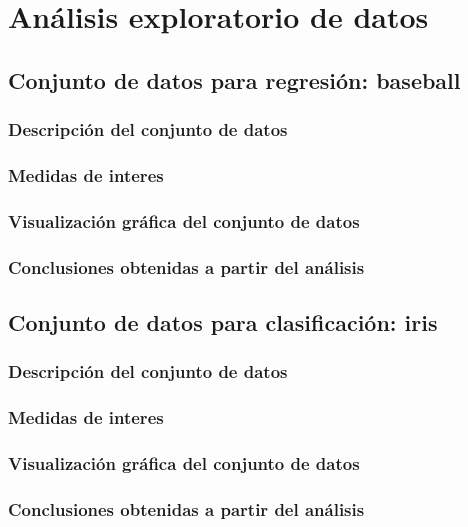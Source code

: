 \section{Análisis exploratorio de datos}


\subsection{Conjunto de datos para regresión: baseball}

\subsubsection{Descripción del conjunto de datos}

\subsubsection{Medidas de interes}

\subsubsection{Visualización gráfica del conjunto de datos}

\subsubsection{Conclusiones obtenidas a partir del análisis}



\subsection{Conjunto de datos para clasificación: iris}

\subsubsection{Descripción del conjunto de datos}

\subsubsection{Medidas de interes}

\subsubsection{Visualización gráfica del conjunto de datos}

\subsubsection{Conclusiones obtenidas a partir del análisis}
